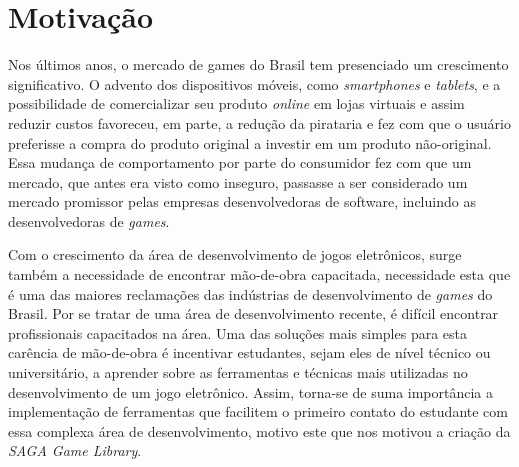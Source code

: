 \chapter{Motivação}
\label{chapter:motivacao}
%
%
%
Nos últimos anos, o mercado de games do Brasil tem presenciado um crescimento significativo. 
O advento dos dispositivos móveis, como \textit{smartphones} e \textit{tablets}, e a possibilidade de comercializar seu produto \textit{online} em lojas virtuais e assim reduzir custos favoreceu, em parte, a redução da pirataria e fez com que o usuário preferisse a compra do produto original a investir em um produto não-original. Essa mudança de comportamento por parte do consumidor fez com que um mercado, que antes era visto como inseguro, passasse a ser considerado um mercado promissor pelas empresas desenvolvedoras de software, incluindo as desenvolvedoras de \textit{games}.
\par
Com o crescimento da área de desenvolvimento de jogos eletrônicos, surge também a necessidade de encontrar mão-de-obra capacitada, necessidade esta que é uma das maiores reclamações das indústrias de desenvolvimento de \textit{games} do Brasil. Por se tratar de uma área de desenvolvimento recente, é difícil encontrar profissionais capacitados na área. Uma das soluções mais simples para esta carência de mão-de-obra é incentivar estudantes, sejam eles de nível técnico ou universitário, a aprender sobre as ferramentas e técnicas mais utilizadas no desenvolvimento de um jogo eletrônico. Assim, torna-se de suma importância a implementação de ferramentas que facilitem o primeiro contato do estudante com essa complexa área de desenvolvimento, motivo este que nos motivou a criação da \textit{SAGA Game Library}.
%
%